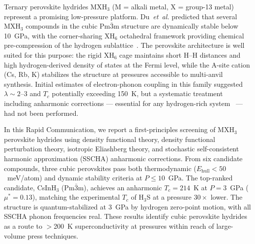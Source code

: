 Ternary perovskite hydrides MXH$_3$ (M = alkali metal, X = group-13
metal) represent a promising low-pressure platform. Du~\textit{et~al.}
predicted that several MXH$_3$ compounds in the cubic Pm$\bar{3}$m
structure are dynamically stable below 10~GPa, with the
corner-sharing XH$_6$ octahedral framework providing chemical
pre-compression of the hydrogen sublattice~\cite{Du2024}. The
perovskite architecture is well suited for this purpose: the rigid
XH$_6$ cage maintains short H--H distances and high hydrogen-derived
density of states at the Fermi level, while the A-site cation (Cs, Rb,
K) stabilizes the structure at pressures accessible to multi-anvil
synthesis. Initial estimates of electron-phonon coupling in this family
suggested $\lambda \sim 2$--$3$ and $T_c$ potentially exceeding 150~K,
but a systematic treatment including anharmonic corrections ---
essential for any hydrogen-rich system~\cite{Errea2020} --- had not
been performed.

In this Rapid Communication, we report a first-principles screening
of MXH$_3$ perovskite hydrides using density functional theory,
density functional perturbation theory, isotropic Eliashberg theory,
and stochastic self-consistent harmonic approximation (SSCHA)
anharmonic corrections. From six candidate compounds, three cubic
perovskites pass both thermodynamic ($E_{\mathrm{hull}} < 50$~meV/atom)
and dynamic stability criteria at $P \leq 10$~GPa. The top-ranked
candidate, CsInH$_3$ (Pm$\bar{3}$m), achieves an anharmonic
$T_c = 214$~K at $P = 3$~GPa ($\mu^* = 0.13$), matching the
experimental $T_c$ of H$_3$S at a pressure $30\times$ lower. The
structure is quantum-stabilized at 3~GPa by hydrogen zero-point
motion, with all SSCHA phonon frequencies real. These results identify
cubic perovskite hydrides as a route to $>$200~K superconductivity at
pressures within reach of large-volume press techniques.

